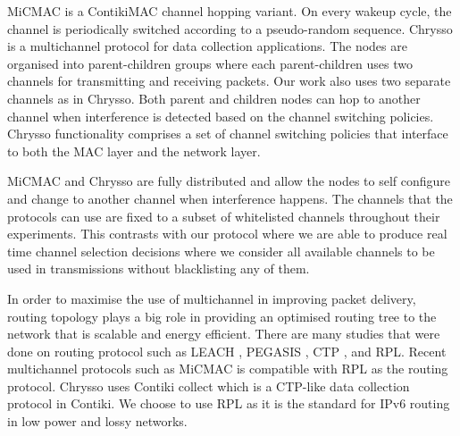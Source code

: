 MiCMAC \cite{micmac} is a ContikiMAC \cite{contikimac} channel hopping variant. On every wakeup cycle, the channel is periodically switched according to a pseudo-random sequence. %
Chrysso \cite{chrysso} is a multichannel protocol for data collection applications. The nodes are organised into parent-children groups where each parent-children uses two channels for transmitting and receiving packets. Our work also uses two separate channels as in Chrysso. Both parent and children nodes can hop to another channel when interference is detected based on the channel switching policies. %
Chrysso functionality comprises a set of channel switching policies that interface to both the MAC layer and the network layer.

MiCMAC and Chrysso are fully distributed and allow the nodes to self configure and change to another channel when interference happens. The channels that the protocols can use are fixed to a subset of whitelisted channels throughout their experiments. This contrasts with our protocol where we are able to produce real time channel selection decisions where we consider all available channels to be used in transmissions without blacklisting any of them. 



In order to maximise the use of multichannel in improving packet delivery, routing topology plays a big role in providing an optimised routing tree to the network that is scalable and energy efficient. There are many studies that were done on routing protocol such as LEACH \cite{leach}, PEGASIS \cite{pegasis}, CTP \cite{ctp}, and RPL. Recent multichannel protocols such as MiCMAC is compatible with RPL as the routing protocol. Chrysso uses Contiki collect which is a CTP-like data collection protocol in Contiki. We choose to use RPL as it is the standard for IPv6 routing in low power and lossy networks. 

